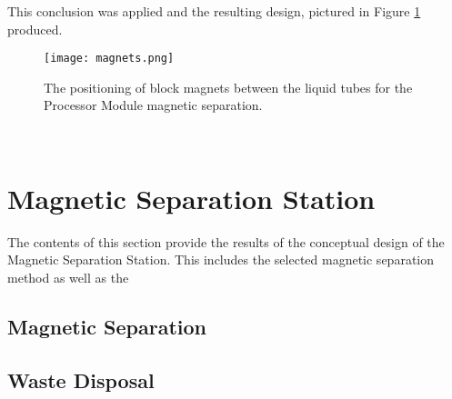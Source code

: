 This conclusion was applied and the resulting design, pictured in Figure \ref{fig:magnets} produced.

\begin{figure}[!htb]
	\centering
	\texttt{[image: magnets.png]}
	\caption[Processor Module Magnet Positioning.]{The positioning of block magnets between the liquid tubes for the Processor Module magnetic separation.}
	\label{fig:magnets}
\end{figure} 
\FloatBarrier



\section{Magnetic Separation Station}

The contents of this section provide the results of the conceptual design of the Magnetic Separation Station. This includes the selected magnetic separation method as well as the 

 

\subsection{Magnetic Separation}

\subsection{Waste Disposal}